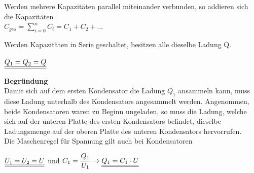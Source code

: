 \beginip
Werden mehrere Kapazitäten parallel miteinander verbunden, so addieren sich die Kapazitäten \\
\formulaBegin
$\displaystyle C_{ges} = \sum_{i=0}^n C_i = C_1 + C_2 + ...$
\formulaEnd
\iend

\beginip
Werden Kapazitäten in Serie geschaltet, besitzen alle dieselbe Ladung Q.
\begin{center}
	\fix
	 $\displaystyle \underline{\underline{Q_1 = Q_2 = Q}}$
\end{center}
\iend

\textbf{Begründung} \\
Damit sich auf dem ersten Kondensator die Ladung $Q_1$ ansammeln kann, muss diese Ladung unterhalb des Kondensators angesammelt werden. Angenommen, beide Kondensatoren waren zu Beginn ungeladen,
so muss die Ladung, welche sich auf der unteren Platte des ersten Kondensators befindet, dieselbe Ladungsmenge auf der oberen Platte des unteren Kondensators hervorrufen. \\
\fix
\fix
\fix
{}
\beginip
Die Maschenregel für Spannung gilt auch bei Kondensatoren
\begin{center}
	\fix
	$\displaystyle \underline{\underline{U_1 = U_2 = U}} $  und  $\displaystyle C_1 = \frac{Q_1}{U_1} \rightarrow \underline{\underline{Q_1 = C_1 \cdot U}}$
\end{center}
\iend

